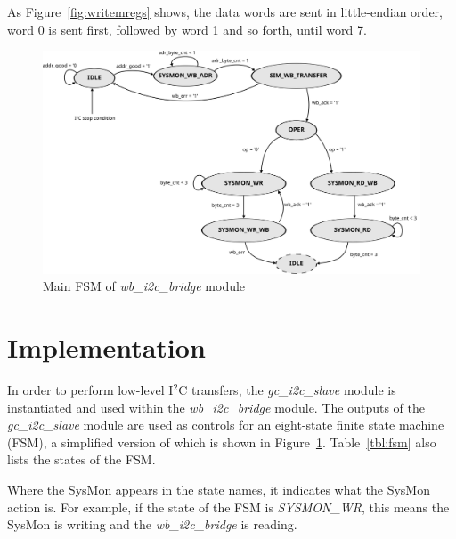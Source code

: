 \documentclass[a4paper,11pt]{article}
\begin{document}
As Figure~\ref{fig:writemregs} shows, the data words are sent in little-endian order,
word 0 is sent first, followed by word 1 and so forth, until word 7.

\begin{figure}[h]
  \centerline{\includegraphics[scale=.55]{fig/fsm}}
  \caption{Main FSM of \textit{wb\_i2c\_bridge} module}
  \label{fig:fsm}
\end{figure}

\pagebreak
\section{Implementation}
\label{sec:implem}

In order to perform low-level I$^2$C transfers, the \textit{gc\_i2c\_slave} module
is instantiated and used within the \textit{wb\_i2c\_bridge} module. The outputs
of the \textit{gc\_i2c\_slave} module  are used as controls for an eight-state finite
state machine (FSM), a simplified version of which is shown in Figure~\ref{fig:fsm}.
Table~\ref{tbl:fsm} also lists the states of the FSM.

Where the SysMon appears in the state names, it indicates what the SysMon action is.
For example, if the state of the FSM is \textit{SYSMON\_WR}, this means the SysMon
is writing and the \textit{wb\_i2c\_bridge} is reading.
\end{document}
